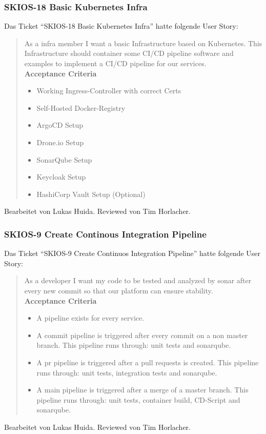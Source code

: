 \subsubsection{SKIOS-18 Basic Kubernetes Infra}
Das Ticket \enquote{SKIOS-18 Basic Kubernetes Infra} hatte folgende User Story:
\begin{quotation}
    As a infra member I want a basic Infrastructure based on Kubernetes. This Infrastructure should container some CI/CD pipeline software and examples to implement
    a CI/CD pipeline for our services. \\
    \textbf{Acceptance Criteria}
    \begin{itemize}
        \item Working Ingress-Controller with correct Certs
        \item Self-Hosted Docker-Registry
        \item ArgoCD Setup
        \item Drone.io Setup
        \item SonarQube Setup
        \item Keycloak Setup
        \item HashiCorp Vault Setup (Optional)
    \end{itemize}
\end{quotation}
Bearbeitet von Lukas Huida.
Reviewed von Tim Horlacher.

\subsubsection{SKIOS-9 Create Continous Integration Pipeline}
Das Ticket \enquote{SKIOS-9 Create Continuos Integration Pipeline} hatte folgende User Story:
\begin{quotation}
    As a developer I want my code to be tested and analyzed by sonar after every new commit so that our platform can ensure stability. \\
    \textbf{Acceptance Criteria}
    \begin{itemize}
        \item A pipeline exists for every service.
        \item A commit pipeline is triggered after every commit on a non master branch. This pipeline runs through: unit tests and sonarqube.
        \item A pr pipeline is triggered after a pull requests is created. This pipeline runs through: unit tests, integration tests and sonarqube.
        \item A main pipeline is triggered after a merge of a master branch. This pipeline runs through: unit tests, container build, CD-Script and sonarqube.
    \end{itemize}
\end{quotation}
Bearbeitet von Lukas Huida.
Reviewed von Tim Horlacher.

